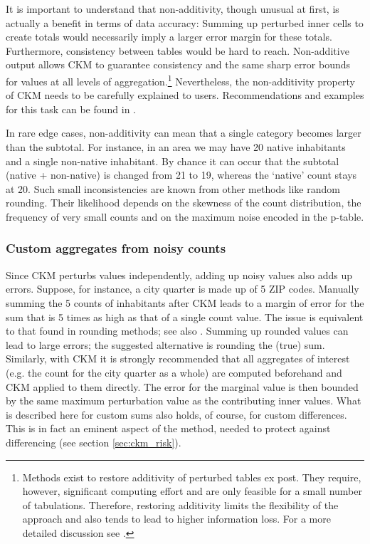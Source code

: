 It is important to understand that non-additivity, though unusual at first, is actually a benefit in terms of data accuracy: Summing up perturbed inner cells to create totals would necessarily imply a larger error margin for these totals. Furthermore, consistency between tables would be hard to reach. Non-additive output allows CKM to guarantee consistency and the same sharp error bounds for values at all levels of aggregation.\footnote{
    Methods exist to restore additivity of perturbed tables ex post. They require, however, significant computing effort and are only feasible for a small number of tabulations. Therefore, restoring additivity limits the flexibility of the approach and also tends to lead to higher information loss. For a more detailed discussion see \citet{EnderleGiessing2017}.
}
Nevertheless, the non-additivity property of CKM needs to be carefully explained to users. Recommendations and examples for this task can be found in \citet[~ch.5]{Guidelines3_CensusDemog}.

In rare edge cases, non-additivity can mean that a single category becomes larger than the subtotal. For instance, in an area we may have 20 native inhabitants and a single non-native inhabitant. By chance it can occur that the subtotal (native + non-native) is changed from 21 to 19, whereas the `native' count stays at 20. Such small inconsistencies are known from other methods like random rounding. Their likelihood depends on the skewness of the count distribution, the frequency of very small counts and on the maximum noise encoded in the p-table.

\subsubsection{Custom aggregates from noisy counts}

Since CKM perturbs values independently, adding up noisy values also adds up errors. Suppose, for instance, a city quarter is made up of 5 ZIP codes. Manually summing the 5 counts of inhabitants after CKM leads to a margin of error for the sum that is 5 times as high as that of a single count value. The issue is equivalent to that found in rounding methods; see also \citet[5.5]{HundepoolEtAl2024}. Summing up rounded values can lead to large errors; the suggested alternative is rounding the (true) sum. Similarly, with CKM it is strongly recommended that all aggregates of interest (e.g. the count for the city quarter as a whole) are computed beforehand and CKM applied to them directly. The error for the marginal value is then bounded by the same maximum perturbation value as the contributing inner values.
What is described here for custom sums also holds, of course, for custom differences. This is in fact an eminent aspect of the method, needed to protect against differencing (see section \ref{sec:ckm_risk}). 


